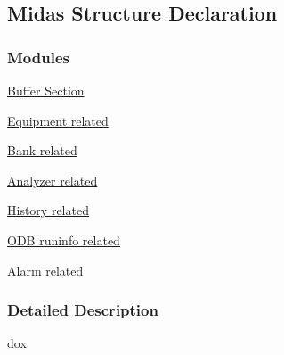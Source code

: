 \subsection{Midas Structure Declaration}
\label{group__msectionh}
\subsubsection*{Modules}
\begin{DoxyCompactItemize}
\item 
\hyperlink{group__mbufferh}{Buffer Section}
\item 
\hyperlink{group__mequipment}{Equipment related}
\item 
\hyperlink{group__mbank}{Bank related}
\item 
\hyperlink{group__manalyzer}{Analyzer related}
\item 
\hyperlink{group__mhistoryh}{History related}
\item 
\hyperlink{group__modbh}{ODB runinfo related}
\item 
\hyperlink{group__malarmh}{Alarm related}
\end{DoxyCompactItemize}


\subsubsection{Detailed Description}
dox 